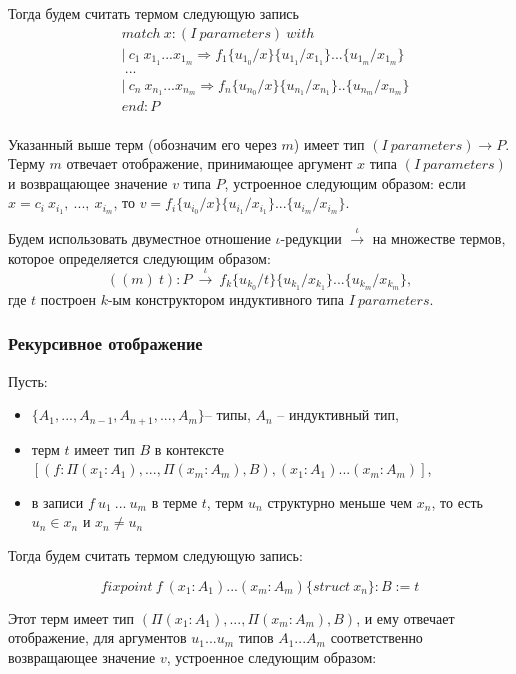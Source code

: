 \documentclass[12pt]{article}
\begin{document}
Тогда будем считать термом следующую запись
\begin{align*}
& match\ x : (I\ parameters)\ with \\
& |\ c_1\ x_{1_1} ... x_{1_m} \Rightarrow f_1\{u_{1_0}/x\}\{u_{1_1}/x_{1_1}\}...\{u_{1_m}/x_{1_m}\}\\
& \ ... \\
& |\ c_n\ x_{n_1} ... x_{n_m} \Rightarrow f_n\{u_{n_0}/x\}\{u_{n_1}/x_{n_1}\}..\{u_{n_m}/x_{n_m}\} \\
& end: P \\
\end{align*}

Указанный выше терм (обозначим его через $m$) имеет тип $(I\ parameters) \xrightarrow{} P$.
Терму $m$ отвечает отображение, принимающее аргумент $x$ типа $(I\ parameters)$ и возвращающее значение $v$ типа $P$, устроенное следующим образом:
если $x = c_i\ x_{i_1},\ ...,\ x_{i_m}$, то $v = f_i\{u_{i_0}/x\}\{u_{i_1}/x_{i_1}\}...\{u_{i_m}/x_{i_m}\}.$

Будем использовать двуместное отношение $\iota$-редукции 
$\xrightarrow{\iota}$ на множестве термов, которое определяется следующим образом:
$$((m)\ t):P\ \xrightarrow{\iota}\ f_k\{u_{k_0}/t\}\{u_{k_1}/x_{k_1}\}...\{u_{k_m}/x_{k_m}\},$$
где $t$ построен $k$-ым конструктором индуктивного типа $I\ parameters$.

\subsubsection{Рекурсивное отображение}

Пусть:
\begin{itemize}
    \item $\{A_1,...,A_{n-1},A_{n+1},...,A_m \}$-- типы, $A_n$ -- индуктивный тип,
    \item терм $t$ имеет тип $B$ в контексте 
    $[(f : \Pi(x_1 : A_1), ...,\Pi(x_m : A_m), B), (x_1 : A_1)...(x_m : A_m)]$,
    \item в записи $f\ u_1\ ...\ u_m$ в терме $t$, терм $u_n$ структурно меньше чем $x_n$, то есть $u_n \in x_n$ и $x_n \neq u_n$
\end{itemize}

Тогда будем считать термом следующую запись:
    
$$fixpoint\ f\ (x_1:A_1)...(x_m:A_m)\{struct\ x_n\}:B:=t$$

Этот терм имеет тип $(\Pi (x_1:A_1),...,\Pi (x_m:A_m), B)$, и ему отвечает отображение, для аргументов $u_1 ... u_m$ типов $A_1 ... A_m$ соответственно возвращающее значение $v$, устроенное следующим образом:
\end{document}
